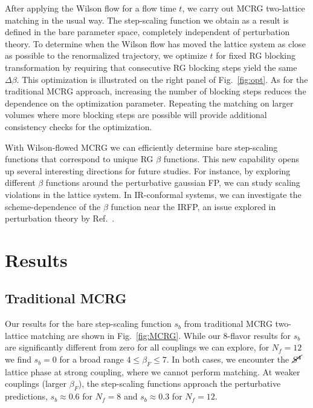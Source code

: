 \documentclass{PoS}
\newcommand{\be}{\ensuremath{\beta} }
\newcommand{\De}{\ensuremath{\Delta} }
\newcommand{\Sb}{\ensuremath{\cancel{S^4}} }
\newcommand{\refcite}[1]{Ref.~\cite{#1}}
\newcommand{\fig}[1]{Fig.~\ref{#1}}
\begin{document}
After applying the Wilson flow for a flow time $t$, we carry out MCRG two-lattice matching in the usual way.
The step-scaling function we obtain as a result is defined in the bare parameter space, completely independent of perturbation theory.
To determine when the Wilson flow has moved the lattice system as close as possible to the renormalized trajectory, we optimize $t$ for fixed RG blocking transformation by requiring that consecutive RG blocking steps yield the same $\De\be$.
This optimization is illustrated on the right panel of \fig{fig:opt}.
As for the traditional MCRG approach, increasing the number of blocking steps reduces the dependence on the optimization parameter.
Repeating the matching on larger volumes where more blocking steps are possible will provide additional consistency checks for the optimization.

With Wilson-flowed MCRG we can efficiently determine bare step-scaling functions that correspond to unique RG \be functions.
This new capability opens up several interesting directions for future studies.
For instance, by exploring different \be functions around the perturbative gaussian FP, we can study scaling violations in the lattice system.
In IR-conformal systems, we can investigate the scheme-dependence of the \be function near the IRFP, an issue explored in perturbation theory by \refcite{Ryttov:2012nt}.



\section{Results} %
\subsection{\label{sec:MCRGresults}Traditional MCRG} %
Our results for the bare step-scaling function $s_b$ from traditional MCRG two-lattice matching are shown in \fig{fig:MCRG}.
While our 8-flavor results for $s_b$ are significantly different from zero for all couplings we can explore, for $N_f = 12$ we find $s_b = 0$ for a broad range $4 \leq \be_F \leq 7$.
In both cases, we encounter the \Sb lattice phase at strong coupling, where we cannot perform matching.
At weaker couplings (larger $\be_F$), the step-scaling functions approach the perturbative predictions, $s_b \approx 0.6$ for $N_f = 8$ and $s_b \approx 0.3$ for $N_f = 12$.
\end{document}
